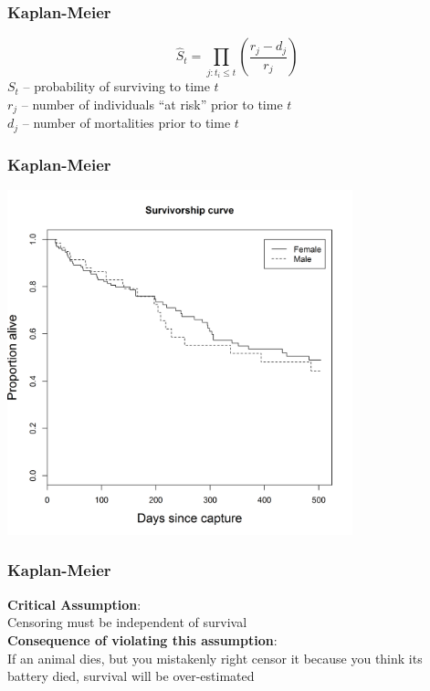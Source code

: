 \documentclass[color=usenames,dvipsnames]{beamer}\usepackage[]{graphicx}\usepackage[]{color}
\begin{document}
\begin{frame}
  \frametitle{Kaplan-Meier}
  \LARGE
  \[
    \hat{S}_t = \prod_{j: t_i \le t}\left(\frac{r_j - d_j}{r_j}\right)
  \]
  \large
  $S_t$ -- probability of surviving to time $t$ \\
  $r_j$ -- number of individuals ``at risk'' prior to time $t$ \\
  $d_j$ -- number of mortalities prior to time $t$
\end{frame}



\begin{frame}
  \frametitle{Kaplan-Meier}
  \begin{center}
    \includegraphics[width=0.75\textwidth]{deerSurv/deerSurvSex}
  \end{center}
\end{frame}




\begin{frame}
  \frametitle{Kaplan-Meier}
  \large
  {\bf Critical Assumption}: \\
  Censoring must be independent of survival \\
  \pause
  \vfill
%  
  {\bf Consequence of violating this assumption}: \\
  If an animal dies, but you mistakenly right censor it because you
  think its battery died, survival will be over-estimated  
\end{frame}
\end{document}

